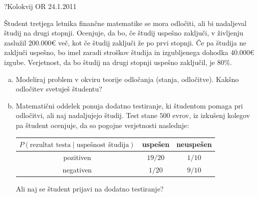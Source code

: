 \begin{naloga}{?}{Kolokvij OR 24.1.2011}
\begin{vprasanje}[drugastopnja]
Študent tretjega letnika finančne matematike se mora odločiti,
ali bi nadaljeval študij na drugi stopnji.
Ocenjuje, da bo, če študij uspešno zaključi,
v življenju zaslužil $200.000 €$ več,
kot če študij zaključi že po prvi stopnji.
Če pa študija ne zaključi uspešno,
bo imel zaradi stroškov študija in izgubljenega dohodka $40.000 €$ izgube.
Verjetnost, da bo študij na drugi stopnji uspešno zaključil, je $80 \%$.
\begin{enumerate}[(a)]
\item Modeliraj problem v okviru teorije odločanja (stanja, odločitve).
Kakšno odločitev svetuješ študentu?

\item Matematični oddelek ponuja dodatno testiranje,
ki študentom pomaga pri odločitvi, ali naj nadaljujejo študij.
Test stane $500$ evrov,
iz izkušenj kolegov pa študent ocenjuje,
da so pogojne verjetnosti naslednje:
\begin{center}
\begin{tabular}{c|cc}
$P(\text{rezultat testa} \;|\; \text{uspešnost študija})$
& uspešen & neuspešen \\ \hline
pozitiven & $19/20$ & $1/10$ \\
negativen & $1/20$ & $9/10$
\end{tabular}
\end{center}
Ali naj se študent prijavi na dodatno testiranje?
\end{enumerate}
\end{vprasanje}
\begin{odgovor}
\end{odgovor}
\end{naloga}



